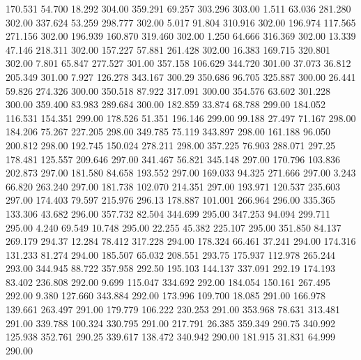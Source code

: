  170.531   54.700   18.292       304.00
 359.291   69.257  303.296       303.00
   1.511   63.036  281.280       302.00
 337.624   53.259  298.777       302.00
   5.017   91.804  310.916       302.00
 196.974  117.565  271.156       302.00
 196.939  160.870  319.460       302.00
   1.250   64.666  316.369       302.00
  13.339   47.146  218.311       302.00
 157.227   57.881  261.428       302.00
  16.383  169.715  320.801       302.00
   7.801   65.847  277.527       301.00
 357.158  106.629  344.720       301.00
  37.073   36.812  205.349       301.00
   7.927  126.278  343.167       300.29
 350.686   96.705  325.887       300.00
  26.441   59.826  274.326       300.00
 350.518   87.922  317.091       300.00
 354.576   63.602  301.228       300.00
 359.400   83.983  289.684       300.00
 182.859   33.874   68.788       299.00
 184.052  116.531  154.351       299.00
 178.526   51.351  196.146       299.00
  99.188   27.497   71.167       298.00
 184.206   75.267  227.205       298.00
 349.785   75.119  343.897       298.00
 161.188   96.050  200.812       298.00
 192.745  150.024  278.211       298.00
 357.225   76.903  288.071       297.25
 178.481  125.557  209.646       297.00
 341.467   56.821  345.148       297.00
 170.796  103.836  202.873       297.00
 181.580   84.658  193.552       297.00
 169.033   94.325  271.666       297.00
   3.243   66.820  263.240       297.00
 181.738  102.070  214.351       297.00
 193.971  120.537  235.603       297.00
 174.403   79.597  215.976       296.13
 178.887  101.001  266.964       296.00
 335.365  133.306   43.682       296.00
 357.732   82.504  344.699       295.00
 347.253   94.094  299.711       295.00
   4.240   69.549   10.748       295.00
  22.255   45.382  225.107       295.00
 351.850   84.137  269.179       294.37
  12.284   78.412  317.228       294.00
 178.324   66.461   37.241       294.00
 174.316  131.233   81.274       294.00
 185.507   65.032  208.551       293.75
 175.937  112.978  265.244       293.00
 344.945   88.722  357.958       292.50
 195.103  144.137  337.091       292.19
 174.193   83.402  236.808       292.00
   9.699  115.047  334.692       292.00
 184.054  150.161  267.495       292.00
   9.380  127.660  343.884       292.00
 173.996  109.700   18.085       291.00
 166.978  139.661  263.497       291.00
 179.779  106.222  230.253       291.00
 353.968   78.631  313.481       291.00
 339.788  100.324  330.795       291.00
 217.791   26.385  359.349       290.75
 340.992  125.938  352.761       290.25
 339.617  138.472  340.942       290.00
 181.915   31.831   64.999       290.00
